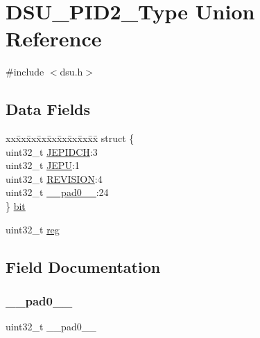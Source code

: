 \hypertarget{union_d_s_u___p_i_d2___type}{}\section{D\+S\+U\+\_\+\+P\+I\+D2\+\_\+\+Type Union Reference}
\label{union_d_s_u___p_i_d2___type}


{\ttfamily \#include $<$dsu.\+h$>$}

\subsection*{Data Fields}
\begin{DoxyCompactItemize}
\item 
\begin{tabbing}
xx\=xx\=xx\=xx\=xx\=xx\=xx\=xx\=xx\=\kill
struct \{\\
\>uint32\_t \mbox{\hyperlink{union_d_s_u___p_i_d2___type_a2429b5d152af8acfa9e7190711ea3c0e}{JEPIDCH}}:3\\
\>uint32\_t \mbox{\hyperlink{union_d_s_u___p_i_d2___type_afbc475d4de3a4f828f001c767a0871d1}{JEPU}}:1\\
\>uint32\_t \mbox{\hyperlink{union_d_s_u___p_i_d2___type_a8f4be4e701bc29e4363db19a3452906a}{REVISION}}:4\\
\>uint32\_t \mbox{\hyperlink{union_d_s_u___p_i_d2___type_a3e57c2ef1c3ffb36722f000cc1156824}{\_\_pad0\_\_}}:24\\
\} \mbox{\hyperlink{union_d_s_u___p_i_d2___type_aaa398fa95940eac8cd806822c0ee2380}{bit}}\\

\end{tabbing}\item 
uint32\+\_\+t \mbox{\hyperlink{union_d_s_u___p_i_d2___type_a6b91636401516a477989a336376d7b40}{reg}}
\end{DoxyCompactItemize}


\subsection{Field Documentation}
\mbox{\label{union_d_s_u___p_i_d2___type_a3e57c2ef1c3ffb36722f000cc1156824}} 
\subsubsection{\texorpdfstring{\_\_pad0\_\_}{\_\_pad0\_\_}}
{\footnotesize\ttfamily uint32\+\_\+t \+\_\+\+\_\+pad0\+\_\+\+\_\+}


